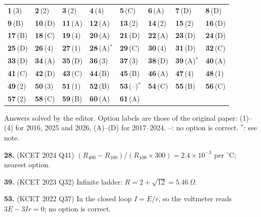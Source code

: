 {\small\setlength{\tabcolsep}{1pt}\renewcommand{\arraystretch}{1.5}
\begin{tabularx}{\linewidth}{@{}*{8}{>{\centering\arraybackslash}X}@{}}\toprule
\textbf{1}\,(3) & \textbf{2}\,(2) & \textbf{3}\,(2) & \textbf{4}\,(4) & \textbf{5}\,(C) & \textbf{6}\,(A) & \textbf{7}\,(D) & \textbf{8}\,(D)\\
\textbf{9}\,(B) & \textbf{10}\,(D) & \textbf{11}\,(A) & \textbf{12}\,(A) & \textbf{13}\,(2) & \textbf{14}\,(2) & \textbf{15}\,(2) & \textbf{16}\,(D)\\
\textbf{17}\,(B) & \textbf{18}\,(C) & \textbf{19}\,(4) & \textbf{20}\,(A) & \textbf{21}\,(D) & \textbf{22}\,(A) & \textbf{23}\,(D) & \textbf{24}\,(D)\\
\textbf{25}\,(D) & \textbf{26}\,(4) & \textbf{27}\,(1) & \textbf{28}\,(A)$^{*}$ & \textbf{29}\,(C) & \textbf{30}\,(4) & \textbf{31}\,(D) & \textbf{32}\,(C)\\
\textbf{33}\,(D) & \textbf{34}\,(A) & \textbf{35}\,(D) & \textbf{36}\,(3) & \textbf{37}\,(3) & \textbf{38}\,(D) & \textbf{39}\,(A)$^{*}$ & \textbf{40}\,(A)\\
\textbf{41}\,(C) & \textbf{42}\,(D) & \textbf{43}\,(C) & \textbf{44}\,(B) & \textbf{45}\,(B) & \textbf{46}\,(A) & \textbf{47}\,(4) & \textbf{48}\,(1)\\
\textbf{49}\,(2) & \textbf{50}\,(3) & \textbf{51}\,(1) & \textbf{52}\,(B) & \textbf{53}\,(--)$^{*}$ & \textbf{54}\,(C) & \textbf{55}\,(B) & \textbf{56}\,(C)\\
\textbf{57}\,(2) & \textbf{58}\,(C) & \textbf{59}\,(B) & \textbf{60}\,(A) & \textbf{61}\,(A) &  &  & \\\bottomrule\end{tabularx}}\par\smallskip
{\footnotesize Answers solved by the editor. Option labels are those of the original paper: (1)--(4) for 2016, 2025 and 2026, (A)--(D) for 2017--2024. --: no option is correct. $^{*}$: see note.
\par\smallskip\textbf{28.} (KCET 2024 Q41) $(R_{400}-R_{100})/(R_{100}\times300) = 2.4\times10^{-3}$ per $^\circ$C; nearest option.
\par\smallskip\textbf{39.} (KCET 2023 Q32) Infinite ladder: $R = 2 + \sqrt{12} = 5.46\,\Omega$.
\par\smallskip\textbf{53.} (KCET 2022 Q37) In the closed loop $I = E/r$, so the voltmeter reads $3E - 3Ir = 0$; no option is correct.
}\par
\par{}\vspace{14pt}
